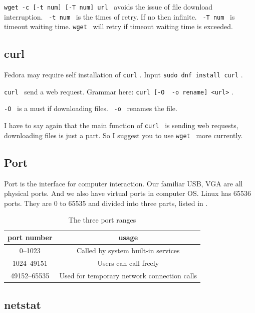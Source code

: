 \documentclass[lang=en,color=blue,12pt]{elegantbook}
\let\oldtexttt\texttt
\renewcommand{\texttt}[1]{%
  \begingroup
  \setlength{\fboxsep}{1pt}%
  \colorbox{gray!10}{\oldtexttt{#1}}%
  \endgroup
}
\begin{document}
\texttt{wget\ -c\ {[}-t\ num{]}\ {[}-T\ num{]}\ url}\ avoids the issue of
file download interruption.\ \texttt{-t\ num}\ is the times of retry. If
no then infinite.\ \texttt{-T\ num}\ is timeout waiting time.
\texttt{wget}\ will retry if timeout waiting time is exceeded.

\subsection{curl}

\begin{note}
Fedora may require self installation of \texttt{curl}. Input
\texttt{sudo\ dnf\ install\ curl}.
\end{note}

\texttt{curl}\ send a web request. Grammar here:
\texttt{curl\ {[}-O\ \textbar{}\ -o\ rename{]}\ \textless{}url\textgreater{}}.

\texttt{-O}\ is a must if downloading files.\ \texttt{-o}\ renames the
file.

I have to say again that the main function of \texttt{curl}\ is sending
web requests, downloading files is just a part. So I suggest you to use
\texttt{wget}\ more currently.

\subsection{Port}

Port is the interface for computer interaction. Our familiar USB, VGA
are all physical ports. And we also have virtual ports in computer OS.
Linux has 65536 ports. They are 0 to 65535 and divided into three parts,
listed in .

\begin{table}[htbp]
    \centering
    \begin{tabular}{cc}
    \toprule
    port number & usage \\
    \midrule
    0--1023 & Called by system built-in services \\
    1024--49151 & Users can call freely \\
    49152--65535 & Used for temporary network connection calls \\
    \bottomrule
    \end{tabular}
    \caption{The three port ranges}
    \label{tab:port-ranges}
\end{table}

\subsection*{netstat}
\end{document}
